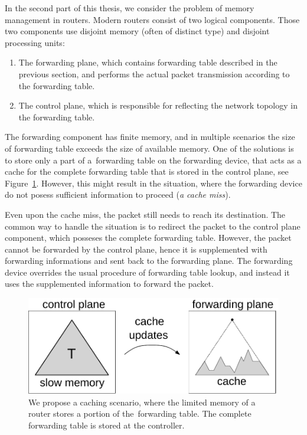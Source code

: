 In the second part of this thesis, we consider the problem of memory management in routers.
Modern routers consist of two logical components. Those two components use disjoint memory (often of distinct type) and disjoint processing units:
\begin{enumerate}
  \item The forwarding plane, which  contains forwarding table described in the previous section, and performs the actual packet transmission according to the forwarding table.
  \item The control plane, which is responsible for reflecting the network topology in the forwarding table.
\end{enumerate}

The forwarding component has finite memory, and in multiple scenarios the size of forwarding table exceeds the size of available memory.
One of the solutions is to store only a part of a~forwarding table on the forwarding device, that acts as a cache for the complete forwarding table that is stored in the control plane, see Figure~\ref{fig:router}.
However, this might result in the situation, where the forwarding device do not posess sufficient information to proceed (\emph{a cache miss}).

Even upon the cache miss, the packet still needs to reach its destination.
The common way to handle the situation is to redirect the packet to the control plane component, which posseses the complete forwarding table.
However, the packet cannot be forwarded by the control plane, hence it is supplemented with forwarding informations and sent back to the forwarding plane.
The forwarding device overrides the usual procedure of forwarding table lookup, and instead it uses the supplemented information to forward the packet.


\begin{figure}[t]
\centering
\includegraphics[width=0.5\columnwidth]{figs/router5.pdf}
\caption{We propose a caching scenario, where the limited memory of a router stores a portion of the~forwarding table. The complete forwarding table is stored at the controller.}\label{fig:router}
\end{figure}




